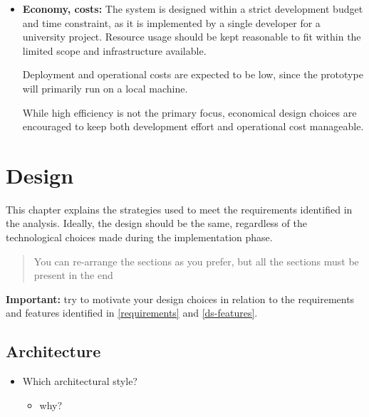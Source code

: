 \documentclass{scrartcl}
\begin{document}
\begin{itemize}
	Computation efficiency is considered at a conceptual level. The system should not introduce unnecessary processing overhead that could negatively affect responsiveness. However, low-level optimization is not a primary goal of the project.
	
	\item \textbf{Economy, costs:} The system is designed within a strict development budget and time constraint, as it is implemented by a single developer for a university project. Resource usage should be kept reasonable to fit within the limited scope and infrastructure available.
	
	Deployment and operational costs are expected to be low, since the prototype will primarily run on a local machine.
	
	While high efficiency is not the primary focus, economical design choices are encouraged to keep both development effort and operational cost manageable.
\end{itemize}

\section{Design}\label{design}

This chapter explains the strategies used to meet the requirements identified in the analysis. 
%
Ideally, the design should be the same, regardless of the technological choices made during the implementation phase.

\begin{quote}
	You can re-arrange the sections as you prefer, but all the sections must be present in the end
\end{quote}

\noindent
\textbf{Important:} try to motivate your design choices in relation to the requirements and features identified 
in \cref{requirements} and \cref{ds-features}.

\subsection{Architecture}\label{architecture}

\begin{itemize}
	\item Which architectural style?
	\begin{itemize}
		\item why?
	\end{itemize}
\end{itemize}
\end{document}
